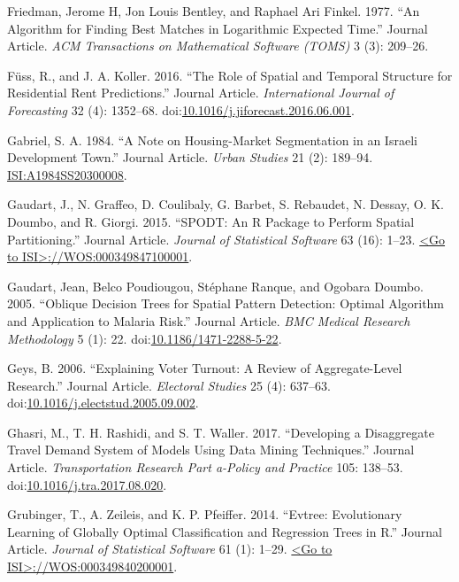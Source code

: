 \documentclass[]{elsarticle} %
\begin{document}
\hypertarget{ref-Friedman1977}{}
Friedman, Jerome H, Jon Louis Bentley, and Raphael Ari Finkel. 1977.
``An Algorithm for Finding Best Matches in Logarithmic Expected Time.''
Journal Article. \emph{ACM Transactions on Mathematical Software (TOMS)}
3 (3): 209--26.

\hypertarget{ref-Fuss2016}{}
Füss, R., and J. A. Koller. 2016. ``The Role of Spatial and Temporal
Structure for Residential Rent Predictions.'' Journal Article.
\emph{International Journal of Forecasting} 32 (4): 1352--68.
doi:\href{https://doi.org/10.1016/j.jiforecast.2016.06.001}{10.1016/j.jiforecast.2016.06.001}.

\hypertarget{ref-Gabriel1984}{}
Gabriel, S. A. 1984. ``A Note on Housing-Market Segmentation in an
Israeli Development Town.'' Journal Article. \emph{Urban Studies} 21
(2): 189--94. \url{ISI:A1984SS20300008}.

\hypertarget{ref-Gaudart2015}{}
Gaudart, J., N. Graffeo, D. Coulibaly, G. Barbet, S. Rebaudet, N.
Dessay, O. K. Doumbo, and R. Giorgi. 2015. ``SPODT: An R Package to
Perform Spatial Partitioning.'' Journal Article. \emph{Journal of
Statistical Software} 63 (16): 1--23.
\href{\%3CGo\%20to\%20ISI\%3E://WOS:000349847100001}{\textless{}Go to ISI\textgreater{}://WOS:000349847100001}.

\hypertarget{ref-Gaudart2005}{}
Gaudart, Jean, Belco Poudiougou, Stéphane Ranque, and Ogobara Doumbo.
2005. ``Oblique Decision Trees for Spatial Pattern Detection: Optimal
Algorithm and Application to Malaria Risk.'' Journal Article. \emph{BMC
Medical Research Methodology} 5 (1): 22.
doi:\href{https://doi.org/10.1186/1471-2288-5-22}{10.1186/1471-2288-5-22}.

\hypertarget{ref-Geys2006}{}
Geys, B. 2006. ``Explaining Voter Turnout: A Review of Aggregate-Level
Research.'' Journal Article. \emph{Electoral Studies} 25 (4): 637--63.
doi:\href{https://doi.org/10.1016/j.electstud.2005.09.002}{10.1016/j.electstud.2005.09.002}.

\hypertarget{ref-Ghasri2017}{}
Ghasri, M., T. H. Rashidi, and S. T. Waller. 2017. ``Developing a
Disaggregate Travel Demand System of Models Using Data Mining
Techniques.'' Journal Article. \emph{Transportation Research Part
a-Policy and Practice} 105: 138--53.
doi:\href{https://doi.org/10.1016/j.tra.2017.08.020}{10.1016/j.tra.2017.08.020}.

\hypertarget{ref-Grubinger2014}{}
Grubinger, T., A. Zeileis, and K. P. Pfeiffer. 2014. ``Evtree:
Evolutionary Learning of Globally Optimal Classification and Regression
Trees in R.'' Journal Article. \emph{Journal of Statistical Software} 61
(1): 1--29.
\href{\%3CGo\%20to\%20ISI\%3E://WOS:000349840200001}{\textless{}Go to ISI\textgreater{}://WOS:000349840200001}.
\end{document}
